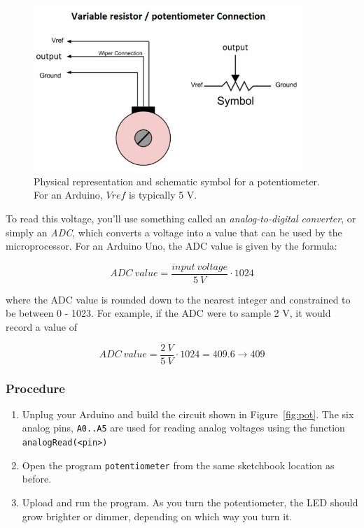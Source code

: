 \documentclass[11pt]{article} %
\begin{document}
\begin{figure}[htbp]
\begin{center}
\includegraphics[width=4in]{figures/potentiometer.jpg}
\caption{Physical representation and schematic symbol for a potentiometer. For an Arduino, $Vref$ is typically 5 V.}
\label{fig:pot.sch}
\end{center}
\end{figure}

To read this voltage, you’ll use something called an \emph{analog-to-digital converter}, or simply an \emph{ADC}, which converts a voltage into a value that can be used by the microprocessor. For an Arduino Uno, the ADC value is given by the formula:

\begin{equation}
ADC\ value = \frac{input\ voltage}{5\ V} \cdot 1024
\label{eq:adc}
\end{equation}

where the ADC value is rounded down to the nearest integer and constrained to be between 0 - 1023. For example, if the ADC were to sample 2 V, it would record a value of

\begin{equation}
ADC\ value = \frac{2\ V}{5\ V} \cdot 1024 = 409.6 \rightarrow 409
\end{equation}


\subsubsection*{Procedure}
\begin{enumerate}
\item Unplug your Arduino and build the circuit shown in Figure~\ref{fig:pot}. The six analog pins, \verb|A0..A5| are used for reading analog voltages using the function \verb|analogRead(<pin>)|
\item Open the program \verb|potentiometer| from the same sketchbook location as before.
\item Upload and run the program. As you turn the potentiometer, the LED should grow brighter or dimmer, depending on which way you turn it.
\end{enumerate}
\end{document}
